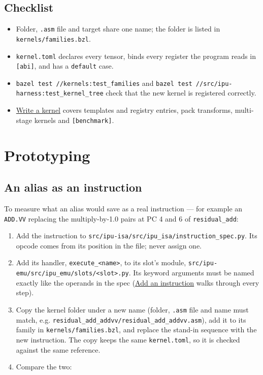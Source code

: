 \documentclass[11pt,a4paper]{article}
\newcommand{\doc}[2]{\href{https://rechefe.github.io/ipu-emulator/dev/#1/}{\textcolor{accent}{#2}}}
\begin{document}

\subsection{Checklist}

\begin{itemize}
\item Folder, \texttt{.asm} file and target share one name; the folder is
  listed in \texttt{kernels/families.bzl}.
\item \texttt{kernel.toml} declares every tensor, binds every register the
  program reads in \texttt{[abi]}, and has a \texttt{default} case.
\item \texttt{bazel test //kernels:test\_families} and
  \texttt{bazel test //src/ipu-harness:test\_kernel\_tree} check that the
  new kernel is registered correctly.
\item \doc{how-to/write-a-kernel}{Write a kernel} covers templates and
  registry entries, pack transforms, multi-stage kernels and
  \texttt{[benchmark]}.
\end{itemize}

\section{Prototyping}

\subsection{An alias as an instruction}

To measure what an alias would save as a real instruction --- for example an
\texttt{ADD.VV} replacing the multiply-by-1.0 pairs at PC 4 and 6 of
\texttt{residual\_add}:

\begin{enumerate}
\item Add the instruction to
  \texttt{src/ipu-isa/src/ipu\_isa/instruction\_spec.py}. Its
  opcode comes from its position in the file; never assign one.
\item Add its handler, \texttt{execute\_<name>}, to its slot's module,
  \texttt{src/ipu-emu/src/ipu\_emu/slots/<slot>.py}. Its keyword
  arguments must be named exactly like the operands in the spec
  (\doc{how-to/add-an-instruction}{Add an instruction} walks through every step).
\item Copy the kernel folder under a new name (folder, \texttt{.asm} file and
  name must match, e.g. \texttt{residual\_add\_addvv/residual\_add\_addvv.asm}),
  add it to its family in \texttt{kernels/families.bzl}, and replace the
  stand-in sequence with the new instruction. The copy keeps the same
  \texttt{kernel.toml}, so it is checked against the same reference.
\item Compare the two:
\end{enumerate}
\end{document}
